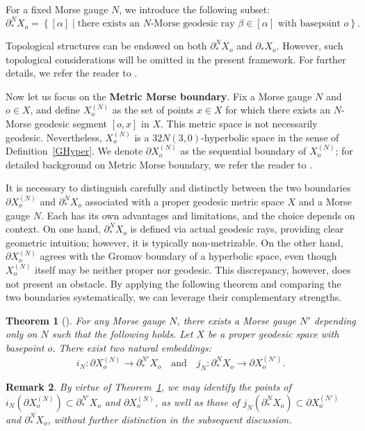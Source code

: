 \documentclass[a4paper,11pt,oneside]{article}
\newtheorem{Theorem}{Theorem}[section]
\newtheorem{Remark}[Theorem]{Remark}
\begin{document}
For a fixed Morse gauge \( N \), we introduce the following subset:
\[
\partial_*^N X_o = \left\{ [\alpha] \mid \text{there exists an } N\text{-Morse geodesic ray } \beta \in [\alpha] \text{ with basepoint } o \right\}.
\]

Topological structures can be endowed on both \( \partial_*^N X_o \) and \( \partial_*X_o \). However, such topological considerations will be omitted in the present framework. For further details, we refer the reader to \cite{Cordes17}.

Now let us focus on the \textbf{Metric Morse boundary}. Fix a Morse gauge \(N\) and $o\in X$, and define \(X_o^{(N)}\) as the set of points \(x\in X\) for which there exists an \(N\)-Morse geodesic segment \([o, x]\) in \(X\).  
This metric space is not necessarily geodesic. Nevertheless, \(X_o^{(N)}\) is a \(32N(3,0)\)-hyperbolic space in the sense of Definition~\ref{GHyper}. We denote \(\partial X^{(N)}_o\) as the sequential boundary of \(X_o^{(N)}\); for detailed background on Metric Morse boundary, we refer the reader to \cite{CordesHume17}.  

It is necessary to distinguish carefully and distinctly between the two boundaries \(\partial X^{(N)}_{o}\) and \(\partial_*^NX_{o}\) associated with a proper geodesic metric space $X$ and a Morse gauge $N$. Each has its own advantages and limitations, and the choice depends on context. On one hand, \(\partial_*^NX_{o}\) is defined via actual geodesic rays, providing clear geometric intuition; however, it is typically non-metrizable. On the other hand, \(\partial X^{(N)}_{o}\) agrees with the Gromov boundary of a hyperbolic space, even though \(X^{(N)}_{o}\) itself may be neither proper nor geodesic. This discrepancy, however, does not present an obstacle. By applying the following theorem and comparing the two boundaries systematically, we can leverage their complementary strengths.


\begin{Theorem}[\cite{CordesHume17,Liu22}]\label{relation}
    For any Morse gauge $N$, there exists a Morse gauge $N'$ depending only on $N$ such that the following holds.
    Let $X$ be a proper geodesic space with basepoint $o$. There exist two natural embeddings:
    \[
    i_N:\partial X^{(N)}_{o}\to\partial_*^{N'}X_{o} \quad \text{and} \quad j_N:\partial_*^{N}X_{o}\to \partial X^{(N')}_{o}.
    \]
\end{Theorem}

\begin{Remark}
    By virtue of Theorem~\ref{relation}, we may identify the points of $i_N(\partial X_o^{(N)})\subset \partial_*^{N'}X_o$ and $\partial X_o^{(N)}$, as well as those of $j_N(\partial_*^NX_o)\subset \partial X_o^{(N')}$ and $\partial_*^NX_o$, without further distinction in the subsequent discussion.
\end{Remark}
\end{document}

